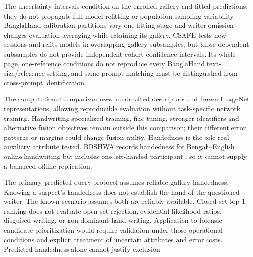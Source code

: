 \documentclass[ASNA,twocolumn]{USG}
\begin{document}
The uncertainty intervals condition on the enrolled gallery and fitted predictions; they do not propagate full model-refitting or population-sampling variability. BanglaHand calibration partitions vary one fitting stage and writer omission changes evaluation averaging while retaining its gallery. CSAFE tests new sessions and refits models in overlapping gallery subsamples, but those dependent subsamples do not provide independent-cohort confidence intervals. Its whole-page, one-reference conditions do not reproduce every BanglaHand text-size/reference setting, and same-prompt matching must be distinguished from cross-prompt identification.

The computational comparison uses handcrafted descriptors and frozen ImageNet representations, allowing reproducible evaluation without task-specific network training. Handwriting-specialized training, fine-tuning, stronger identifiers and alternative fusion objectives remain outside this comparison; their different error patterns or margins could change fusion utility. Handedness is the sole real auxiliary attribute tested. BDSHWA records handedness for Bengali--English online handwriting but includes one left-handed participant \cite{bdshwa2026}, so it cannot supply a balanced offline replication.

The primary predicted-query protocol assumes reliable gallery handedness. Knowing a suspect's handedness does not establish the hand of the questioned writer. The known scenario assumes both are reliably available. Closed-set top-1 ranking does not evaluate open-set rejection, evidential likelihood ratios, disguised writing, or non-dominant-hand writing. Application to forensic candidate prioritization would require validation under those operational conditions and explicit treatment of uncertain attributes and error costs. Predicted handedness alone cannot justify exclusion.
\end{document}
